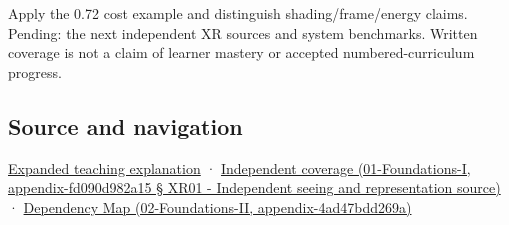 Apply the 0.72 cost example and distinguish shading/frame/energy claims. Pending: the next independent XR sources and system benchmarks. Written coverage is not a claim of learner mastery or accepted numbered-curriculum progress.

\subsection{Source and navigation}\label{source-and-navigation}

\href{Continuous\%20Notes/University\%20-\%20Worlds,\%20Images\%20and\%20Inference\%20-\%20Graphics,\%20Vision\%20and\%20Photography\#Foveation\%20is\%20allocation\%20under\%20uncertain\%20perception\%20and\%20timing}{Expanded teaching explanation} · \href{}{Independent coverage (01-Foundations-I, appendix-fd090d982a15 § XR01 - Independent seeing and representation source)} · \href{}{Dependency Map (02-Foundations-II, appendix-4ad47bdd269a)}
